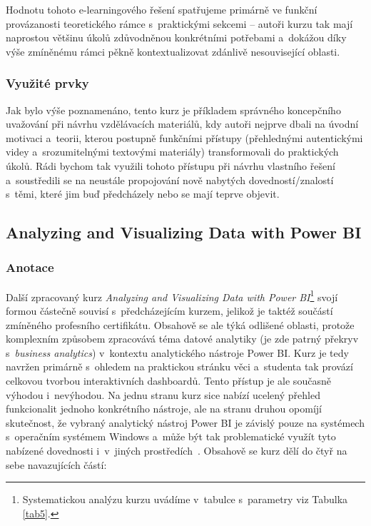 Hodnotu tohoto e-learningového řešení spatřujeme primárně ve funkční provázanosti teoretického rámce s~praktickými sekcemi -- autoři kurzu tak mají naprostou většinu úkolů zdůvodněnou konkrétními potřebami a~dokážou díky výše zmíněnému rámci pěkně kontextualizovat zdánlivě nesouvisející oblasti.

\hypertarget{vyuux17eituxe9-prvky-3}{%
\subsubsection{Využité prvky}\label{vyuux17eituxe9-prvky-3}}

Jak bylo výše poznamenáno, tento kurz je příkladem správného koncepčního uvažování při návrhu vzdělávacích materiálů, kdy autoři nejprve dbali na úvodní motivaci a~teorii, kterou postupně funkčními přístupy (přehlednými autentickými videy a~srozumitelnými textovými materiály) transformovali do praktických úkolů. Rádi bychom tak využili tohoto přístupu při návrhu vlastního řešení a~soustředili se na neustále propojování nově nabytých dovedností/znalostí s~těmi, které jim buď předcházely nebo se mají teprve objevit.

\hypertarget{analyzing-and-visualizing-data-with-power-bi}{%
\subsection{Analyzing and Visualizing Data with Power BI}\label{analyzing-and-visualizing-data-with-power-bi}}

\hypertarget{anotace-4}{%
\subsubsection{Anotace}\label{anotace-4}}

Další zpracovaný kurz \emph{Analyzing and Visualizing Data with Power BI}\footnote{Systematickou analýzu kurzu uvádíme v~tabulce s~parametry viz Tabulka \ref{tab5}.} svojí formou částečně souvisí s~předcházejícím kurzem, jelikož je taktéž součástí zmíněného profesního certifikátu. Obsahově se ale týká odlišené oblasti, protože komplexním způsobem zpracovává téma datové analytiky (je zde patrný překryv s~\emph{business analytics}) v~kontextu analytického nástroje Power BI. Kurz je tedy navržen primárně s~ohledem na praktickou stránku věci a~studenta tak provází celkovou tvorbou interaktivních dashboardů. Tento přístup je ale současně výhodou i~nevýhodou. Na jednu stranu kurz sice nabízí ucelený přehled funkcionalit jednoho konkrétního nástroje, ale na stranu druhou opomíjí skutečnost, že vybraný analytický nástroj Power BI je závislý pouze na systémech s~operačním systémem Windows a~může být tak problematické využít tyto nabízené dovednosti i~v~jiných prostředích~\parencite{course5}. Obsahově se kurz dělí do čtyř na sebe navazujících částí:


